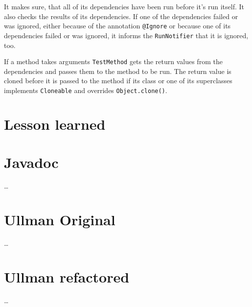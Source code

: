 \documentclass[11pt]{article}
\begin{document}
It makes sure, that all of its dependencies have been run before it's run itself. It also checks the results of its dependencies. If one of the dependencies failed or was ignored, either because of the annotation \verb|@Ignore| or because one of its dependencies failed or was ignored, it informs the \verb|RunNotifier| that it is ignored, too.

If a method takes arguments \verb|TestMethod| gets the return values from the dependencies and passes them to the method to be run. The return value is cloned before it is passed to the method if its class or one of its superclasses implements \verb|Cloneable| and overrides \verb|Object.clone()|.

\section{Lesson learned}

\begin{appendix}
\section{Javadoc}
\dots

\section{Ullman Original}
\dots

\section{Ullman refactored}
\dots

\end{appendix}
\end{document}
